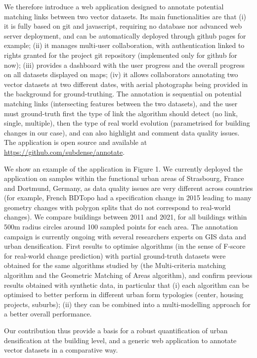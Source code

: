 \documentclass[11pt]{article}
\begin{document}
We therefore introduce a web application designed to annotate potential matching links between two vector datasets. Its main functionalities are that (i) it is fully based on git and javascript, requiring no database nor advanced web server deployment, and can be automatically deployed through github pages for example; (ii) it manages multi-user collaboration, with authentication linked to rights granted for the project git repository (implemented only for github for now); (iii) provides a dashboard with the user progress and the overall progress on all datasets displayed on maps; (iv) it allows collaborators annotating two vector datasets at two different dates, with aerial photographs being provided in the background for ground-truthing. The annotation is sequential on potential matching links (intersecting features between the two datasets), and the user must ground-truth first the type of link the algorithm should detect (no link, single, multiple), then the type of real world evolution (parametrised for building changes in our case), and can also highlight and comment data quality issues. The application is open source and available at \url{https://github.com/subdense/annotate}.

We show an example of the application in Figure 1. We currently deployed the application on samples within the functional urban areas of Strasbourg, France and Dortmund, Germany, as data quality issues are very different across countries (for example, French BDTopo had a specification change in 2015 leading to many geometry changes with polygon splits that do not correspond to real-world changes). We compare buildings between 2011 and 2021, for all buildings within 500m radius circles around 100 sampled points for each area. The annotation campaign is currently ongoing with several researchers experts on GIS data and urban densification. First results to optimise algorithms (in the sense of F-score for real-world change prediction) with partial ground-truth datasets were obtained for the same algorithms studied by \cite{guardiola2024optimising} (the Multi-criteria matching algorithm and the Geometric Matching of Areas algorithm), and confirm previous results obtained with synthetic data, in particular that (i) each algorithm can be optimised to better perform in different urban form typologies (center, housing projects, suburbs); (ii) they can be combined into a multi-modelling approach for a better overall performance.

Our contribution thus provide a basis for a robust quantification of urban densification at the building level, and a generic web application to annotate vector datasets in a comparative way.
\end{document}
